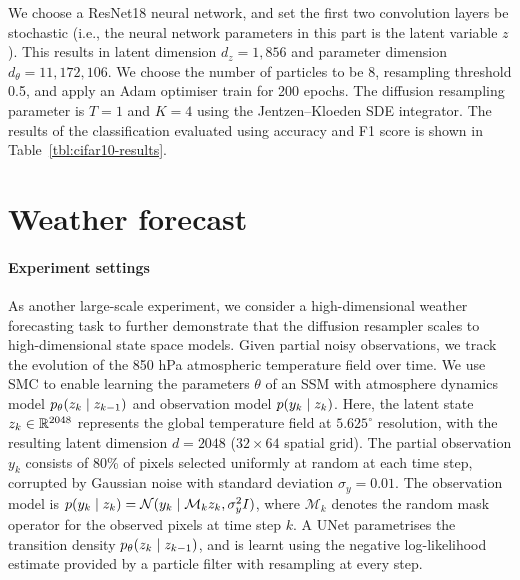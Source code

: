 \documentclass{article}
\begin{document}
We choose a ResNet18 neural network, and set the first two convolution layers be stochastic (i.e., the neural network parameters in this part is the latent variable $z$). 
This results in latent dimension $d_z = 1,856$ and parameter dimension $d_\theta = 11,172,106$. 
We choose the number of particles to be 8, resampling threshold 0.5, and apply an Adam optimiser train for 200 epochs.
The diffusion resampling parameter is $T = 1$ and $K=4$ using the Jentzen--Kloeden SDE integrator. 
The results of the classification evaluated using accuracy and F1 score is shown in Table~\ref{tbl:cifar10-results}.

\begin{table}[t!]
    \centering
    \caption{CIFAR10 classification with different resampling methods. Results are averaged over 5 independent trainings.}
    \label{tbl:cifar10-results}
\end{table}

\section{Weather forecast}
\label{app:weather}
\paragraph{Experiment settings}
As another large-scale experiment, we consider a high-dimensional weather forecasting task to further demonstrate that the diffusion resampler scales to high-dimensional state space models. Given partial noisy observations, we track the evolution of the 850 hPa atmospheric temperature field over time. We use SMC to enable learning the parameters $\theta$ of an SSM with atmosphere dynamics model $p_\theta(z_k {\;|\;} z_{k-1})$ and observation model $p(y_k {\;|\;} z_k)$. Here, the latent state $z_k \in \mathbb{R}^{2048}$ represents the global temperature field at $5.625^\circ$ resolution, with the resulting latent dimension $d=2048$ ($32 \times 64$ spatial grid). 
The partial observation $y_k$ consists of $80$\% of pixels selected uniformly at random at each time step, corrupted by Gaussian noise with standard deviation $\sigma_y = 0.01$. The observation model is $p(y_k {\;|\;} z_k) = \mathcal{N}(y_k {\;|\;} \mathcal{M}_kz_k, \sigma_y^2 I)$, where $\mathcal{M}_k$ denotes the random mask operator for the observed pixels at time step $k$.
A UNet parametrises the transition density $p_\theta(z_k {\;|\;} z_{k-1})$, and is learnt using the negative log-likelihood estimate provided by a particle filter with resampling at every step.
\end{document}
